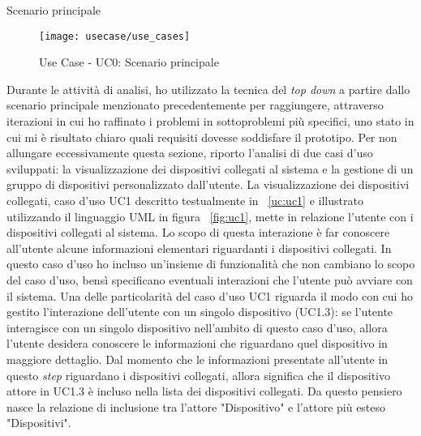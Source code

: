 \begin{usecase}{0}{Scenario principale}
\label{uc:scenario-principale}
\end{usecase}

\begin{figure}[!h]
    \centering
    \texttt{[image: usecase/use\_cases]}
    \caption{Use Case - UC0: Scenario principale}
    \label{fig:scenario-principale}
\end{figure}

Durante le attività di analisi, ho utilizzato la tecnica del \emph{top down} a partire dallo scenario principale menzionato precedentemente per raggiungere, attraverso iterazioni in cui ho raffinato i problemi in sottoproblemi più specifici, uno stato in cui mi è risultato chiaro quali requisiti dovesse soddisfare il prototipo.
Per non allungare eccessivamente questa sezione, riporto l'analisi di due casi d'uso sviluppati: la visualizzazione dei dispositivi collegati al sistema e la gestione di un gruppo di dispositivi personalizzato dall'utente.
La visualizzazione dei dispositivi collegati, caso d'uso UC1 descritto testualmente in ~\ref{uc:uc1} e illustrato utilizzando il linguaggio UML in figura ~\ref{fig:uc1}, mette in relazione l'utente con i dispositivi collegati al sistema. Lo scopo di questa interazione è far conoscere all'utente alcune informazioni elementari riguardanti i dispositivi collegati. In questo caso d'uso ho incluso un'insieme di funzionalità che non cambiano lo scopo del caso d'uso, bensì specificano eventuali interazioni che l'utente può avviare con il sistema. Una delle particolarità del caso d'uso UC1 riguarda il modo con cui ho gestito l'interazione dell'utente con un singolo dispositivo (UC1.3): se l'utente interagisce con un singolo dispositivo nell'ambito di questo caso d'uso, allora l'utente desidera conoscere le informazioni che riguardano quel dispositivo in maggiore dettaglio. Dal momento che le informazioni presentate all'utente in questo \emph{step} riguardano i dispositivi collegati, allora significa che il dispositivo attore in UC1.3 è incluso nella lista dei dispositivi collegati. Da questo pensiero nasce la relazione di inclusione tra l'attore "Dispositivo" e l'attore più esteso "Dispositivi".


